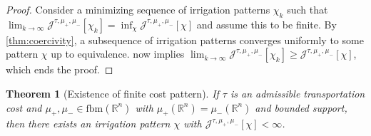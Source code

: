 \documentclass[10pt,a4paper,oneside,final]{article}
\newcommand{\R}{{\mathbb{R}}}
\newcommand{\fbm}{{\mathrm{fbm}}}
\newcommand{\JEn}{{\mathcal{J}}}
\numberwithin{equation}{section}
\theoremstyle{plain}
\newtheorem{theorem}{Theorem}[section]
\theoremstyle{definition}
\theoremstyle{remark}
\begin{document}
\begin{proof}
Consider a minimizing sequence of irrigation patterns $\chi_k$ such that $\lim_{k\to\infty}\JEn^{\tau,\mu_+,\mu_-}[\chi_k]=\inf_\chi \JEn^{\tau,\mu_+,\mu_-}[\chi]$ and assume this to be finite.
By \cref{thm:coercivity}, a subsequence of irrigation patterns converges uniformly to some pattern $\chi$ up to equivalence.
 now implies $\lim_{k\to\infty}\JEn^{\tau,\mu_+,\mu_-}[\chi_k]\geq\JEn^{\tau,\mu_+,\mu_-}[\chi]$, which ends the proof.
\end{proof}

\begin{theorem}[Existence of finite cost pattern]
If $\tau$ is an admissible transportation cost and $\mu_+,\mu_-\in\fbm(\R^n)$ with $\mu_+(\R^n)=\mu_-(\R^n)$ and bounded support,
then there exists an irrigation pattern $\chi$ with $\JEn^{\tau,\mu_+,\mu_-}[\chi]<\infty$.
\end{theorem}
\end{document}
